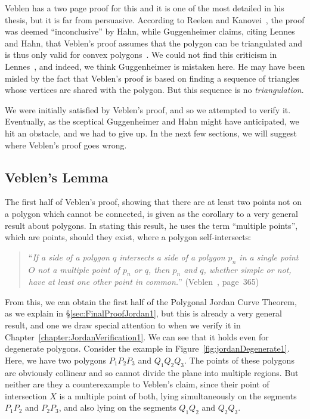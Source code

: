 Veblen has a two page proof for this and it is one of the most detailed in his thesis, but it is far from persuasive. According to Reeken and Kanovei~\cite{HahnInconclusiveIndirect}, the proof was deemed ``inconclusive'' by Hahn, while Guggenheimer claims, citing Lennes and Hahn, that Veblen's proof assumes that the polygon can be triangulated and is thus only valid for convex polygons~\cite{GuggenheimerJordanCurve}. We could not find this criticism in Lennes~\cite{LennesPolygon}, and indeed, we think Guggenheimer is mistaken here. He may have been misled by the fact that Veblen's proof is based on finding a sequence of triangles whose vertices are shared with the polygon. But this sequence is no \emph{triangulation}. 

We were initially satisfied by Veblen's proof, and so we attempted to verify it. Eventually, as the sceptical Guggenheimer and Hahn might have anticipated, we hit an obstacle, and we had to give up. In the next few sections, we will suggest where Veblen's proof goes wrong.

\subsection{Veblen's Lemma}\label{sec:VeblenLemma1}
The first half of Veblen's proof, showing that there are at least two points not on a polygon which cannot be connected, is given as the corollary to a very general result about polygons. In stating this result, he uses the term ``multiple points'', which are points, should they exist, where a polygon self-intersects:
\begin{quote}
``\emph{If a side of a polygon $q$ intersects a side of a polygon $p_n$ in a single point $O$ not a multiple point of $p_n$ or $q$, then $p_n$ and $q$, whether simple or not, have at least one other point in common.}'' (Veblen~\cite{Veblenphd}, page~365)
\end{quote}

From this, we can obtain the first half of the Polygonal Jordan Curve Theorem, as we explain in \S\ref{sec:FinalProofJordan1}, but this is already a very general result, and one we draw special attention to when we verify it in Chapter~\ref{chapter:JordanVerification1}. We can see that it holds even for  degenerate polygons. Consider the example in Figure~\ref{fig:jordanDegenerate1}. Here, we have two polygons $P_1P_2P_3$ and $Q_1Q_2Q_3$. The points of these polygons are obviously collinear and so cannot divide the plane into multiple regions. But neither are they a counterexample to Veblen's claim, since their point of intersection $X$ is a multiple point of both, lying simultaneously on the segments $P_1P_2$ and $P_2P_3$, and also lying on the segments $Q_1Q_2$ and $Q_2Q_3$.

